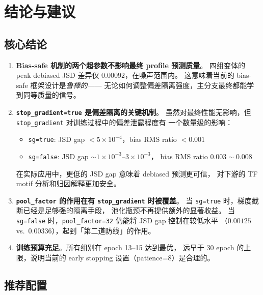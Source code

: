 \documentclass[11pt,a4paper]{ctexart}
\begin{document}
\section{结论与建议}

\subsection{核心结论}

\begin{enumerate}[leftmargin=2em]
  \item \textbf{Bias-safe 机制的两个超参数不影响最终 profile 预测质量}。
    四组变体的 peak debiased JSD 差异仅 $0.00092$，在噪声范围内。
    这意味着当前的 bias-safe 框架设计是\emph{鲁棒的}——
    无论如何调整偏差隔离强度，主分支最终都能学到同等质量的信号。

  \item \textbf{\texttt{stop\_gradient=true} 是偏差隔离的关键机制}。
    虽然对最终性能无影响，但 \texttt{stop\_gradient} 对训练过程中的偏差泄露程度有
    一个数量级的影响：
    \begin{itemize}
      \item \texttt{sg=true}: JSD gap $< 5 \times 10^{-4}$，bias RMS ratio $< 0.001$
      \item \texttt{sg=false}: JSD gap $\sim 1 \times 10^{-3} \text{--} 3 \times 10^{-3}$，
        bias RMS ratio $0.003 \sim 0.008$
    \end{itemize}
    在实际应用中，更低的 JSD gap 意味着 debiased 预测更可信，
    对下游的 TF motif 分析和归因解释更加安全。

  \item \textbf{\texttt{pool\_factor} 的作用在有 \texttt{stop\_gradient} 时被覆盖}。
    当 \texttt{sg=true} 时，梯度截断已经是足够强的隔离手段，
    池化瓶颈不再提供额外的显著收益。
    当 \texttt{sg=false} 时，\texttt{pool\_factor=32} 仍能将 JSD gap 控制在较低水平
    （$0.00125$ vs.\ $0.00336$），起到「第二道防线」的作用。

  \item \textbf{训练预算充足}。所有组别在 epoch 13--15 达到最优，
    远早于 30 epoch 的上限，说明当前的 early stopping 设置（patience=8）是合理的。
\end{enumerate}

\subsection{推荐配置}
\end{document}
